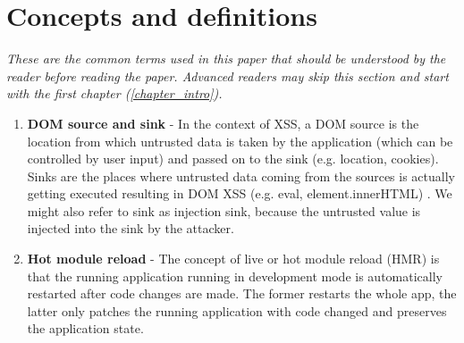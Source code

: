 \chapter*{Concepts and definitions} %
\label{definitions}

\textit{These are the common terms used in this paper that should be understood by the reader before
  reading the paper. Advanced readers may skip this section and start with the first chapter
  (\ref{chapter_intro}).}

\begin{enumerate}
  \item \label{def:dom_source_sink} \textbf{DOM source and sink} - In the context of XSS, a DOM
        source is the location from which untrusted data is taken by the application (which can be
        controlled by user input) and passed on to the sink (e.g. location, cookies). Sinks are the
        places where untrusted data coming from the sources is actually getting executed resulting
        in DOM XSS (e.g. eval, element.innerHTML) \cite{source_sink_definition}. We might also refer
        to sink as injection sink, because the untrusted value is injected into the sink by the
        attacker.
  \item \label{def:hot_reload} \textbf{Hot module reload} - The concept of live or hot module
        reload (HMR) is that the running application running in development mode is automatically
        restarted after code changes are made. The former restarts the whole app, the latter only
        patches the running application with code changed and preserves the application state.
\end{enumerate}
